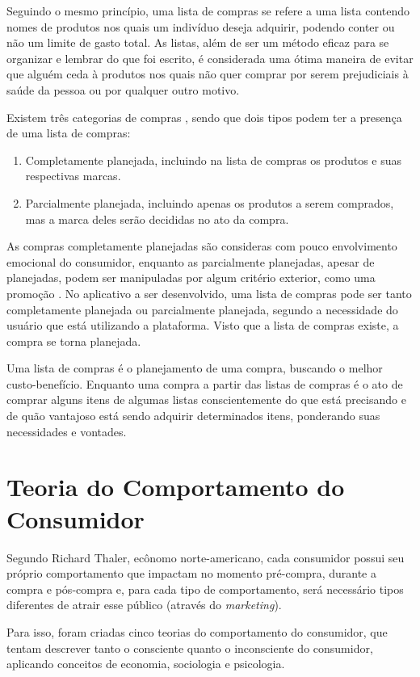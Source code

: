 Seguindo o mesmo princípio, uma lista de compras se refere a uma lista contendo nomes de produtos nos quais um indivíduo deseja adquirir, podendo conter ou não um limite de gasto total. As listas, além de ser um método eficaz para se organizar e lembrar do que foi escrito, é considerada uma ótima maneira de evitar que alguém ceda à produtos nos quais não quer comprar por serem prejudiciais à saúde da pessoa \cite{GroceryList} ou por qualquer outro motivo.

Existem três categorias de compras \cite{ComprasNaoPlanejadas}, sendo que dois tipos podem ter a presença de uma lista de compras:
\begin{enumerate}
\item Completamente planejada, incluindo na lista de compras os produtos e suas respectivas marcas.
\item Parcialmente planejada, incluindo apenas os produtos a serem comprados, mas a marca deles serão decididas no ato da compra.
\end{enumerate}

As compras completamente planejadas são consideras com pouco envolvimento emocional do consumidor, enquanto as parcialmente planejadas, apesar de planejadas, podem ser manipuladas por algum critério exterior, como uma promoção \cite{ComprasNaoPlanejadas}. No aplicativo a ser desenvolvido, uma lista de compras pode ser tanto completamente planejada ou parcialmente planejada, segundo a necessidade do usuário que está utilizando a plataforma. Visto que a lista de compras existe, a compra se torna planejada.

Uma lista de compras é o planejamento de uma compra, buscando o melhor custo-benefício. Enquanto uma compra a partir das listas de compras é o ato de comprar alguns itens de algumas listas conscientemente do que está precisando e de quão vantajoso está sendo adquirir determinados itens, ponderando suas necessidades e vontades.

\section{Teoria do Comportamento do Consumidor}

Segundo Richard Thaler, ecônomo norte-americano, cada consumidor possui seu próprio comportamento que impactam no momento pré-compra, durante a compra e pós-compra e, para cada tipo de comportamento, será necessário tipos diferentes de atrair esse público (através do \textit{marketing}). 

Para isso, foram criadas cinco teorias do comportamento do consumidor, que tentam descrever tanto o consciente quanto o inconsciente do consumidor, aplicando conceitos de economia, sociologia e psicologia. \cite{TeoriasConsumidor}


